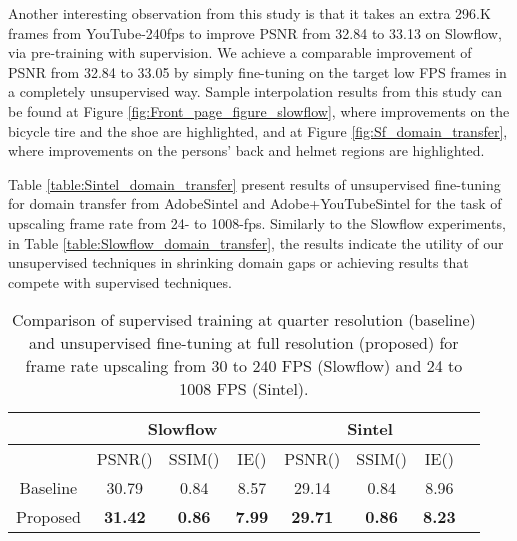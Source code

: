 \documentclass[10pt,twocolumn,letterpaper]{article}
\renewcommand{\textrightarrow}{}
\begin{document}
Another interesting observation from this study is that it takes an extra 296.K frames from YouTube-240fps to improve PSNR from 32.84 to 33.13 on Slowflow, via pre-training with supervision. We achieve a comparable improvement of PSNR from 32.84 to 33.05 by simply fine-tuning on the target low FPS frames in a completely unsupervised way. 
Sample interpolation results from this study can be found at Figure \ref{fig:Front_page_figure_slowflow}, where improvements on the bicycle tire and the shoe are highlighted, and at Figure \ref{fig:Sf_domain_transfer}, where improvements on the persons' back and helmet regions are highlighted.

Table \ref{table:Sintel_domain_transfer} present results of unsupervised fine-tuning for domain transfer from Adobe\textrightarrow Sintel and Adobe+YouTube\textrightarrow Sintel for the task of upscaling frame rate from 24- to 1008-fps. Similarly to the Slowflow experiments, in Table \ref{table:Slowflow_domain_transfer}, the results indicate the utility of our unsupervised techniques in shrinking domain gaps or achieving results that compete with supervised techniques.




\begin{table}[h]
\small
\renewcommand\tabcolsep{3.0pt}
\centering
\begin{tabular}{c  c  c  c   |  c  c  c  c}
\hline
& \multicolumn{3}{c}{\textbf{Slowflow}} & \multicolumn{3}{c}{\textbf{Sintel}} \\
\hline
 & PSNR()  & SSIM() & IE() &  PSNR()  & SSIM() & IE() \\ 
\hline
Baseline & 30.79 & 0.84 & 8.57 & 29.14  & 0.84  & 8.96\\ 
Proposed & \textbf{31.42} & \textbf{0.86}& \textbf{7.99} & \textbf{29.71}  & \textbf{0.86}  & \textbf{8.23} \\ 
\hline
\end{tabular}
\caption{Comparison of supervised training at quarter resolution (baseline) and unsupervised fine-tuning at full resolution (proposed) for frame rate upscaling from 30 to 240 FPS (Slowflow) and 24 to 1008 FPS (Sintel).}
\label{table:Slowflow_Sintel_spatial_transfer}
\end{table}
\end{document}
